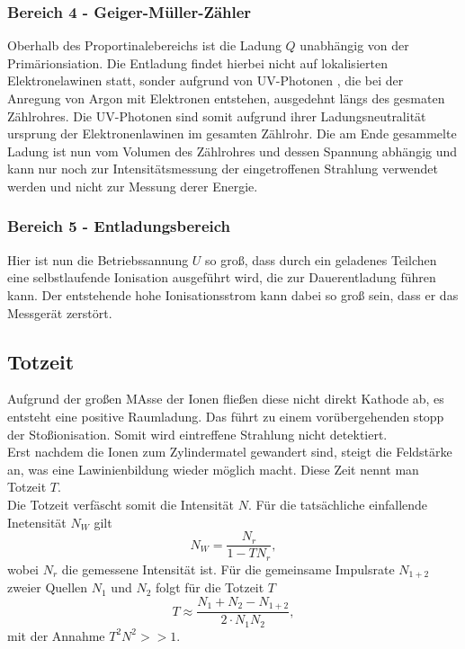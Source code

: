 \subsubsection*{Bereich 4 - Geiger-Müller-Zähler}
Oberhalb des Proportinalebereichs ist die Ladung $Q$ unabhängig von der
Primärionsiation. Die Entladung findet hierbei nicht auf lokalisierten Elektronelawinen statt,
sonder aufgrund von UV-Photonen , die bei der Anregung von Argon mit Elektronen entstehen,
ausgedehnt längs des gesmaten Zählrohres. Die UV-Photonen sind somit aufgrund ihrer Ladungsneutralität
ursprung der Elektronenlawinen im gesamten Zählrohr.
Die am Ende gesammelte Ladung ist nun vom Volumen des Zählrohres und dessen Spannung abhängig und kann
nur noch zur Intensitätsmessung der eingetroffenen Strahlung verwendet werden und nicht zur Messung derer
Energie.
\subsubsection*{Bereich 5 - Entladungsbereich}
Hier ist nun die Betriebssannung $U$ so groß, dass durch ein geladenes Teilchen eine
selbstlaufende Ionisation ausgeführt wird, die zur Dauerentladung führen kann.
Der entstehende hohe Ionisationsstrom kann dabei so groß sein, dass er das
Messgerät zerstört.
\subsection{Totzeit}
Aufgrund der großen MAsse der Ionen fließen diese nicht direkt Kathode ab, es 
entsteht eine positive Raumladung. Das führt zu einem vorübergehenden stopp der Stoßionisation.
Somit wird eintreffene Strahlung nicht detektiert.\\
Erst nachdem die Ionen zum Zylindermatel gewandert sind, steigt die Feldstärke 
an, was eine Lawinienbildung wieder möglich macht. Diese Zeit nennt man Totzeit $T$.
\\Die Totzeit verfäscht somit die Intensität $N$. Für die tatsächliche einfallende Inetensität $N_W$
gilt
\begin{equation}
    N_W=\frac{N_r}{1-TN_r},
\end{equation}
wobei $N_r$ die gemessene Intensität ist.
Für die gemeinsame Impulsrate $N_{1+2}$ zweier Quellen $N_1$ und $N_2$ folgt für
die Totzeit $T$
\begin{equation}
    T \approx \frac{N_1+N_2-N_{1+2}}{2\cdot N_1N_2},
    \label{eqn:2Quellen}
\end{equation}
mit der Annahme $T^2N^2>>1$.
